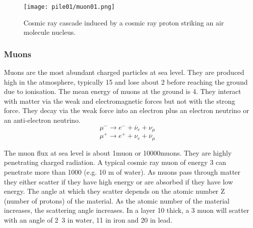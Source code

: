 \documentclass[twoside,titlepage,11pt,twocolumn,a4paper]{article}
\begin{document}
\begin{figure}
  \texttt{[image: pile01/muon01.png]}
  \caption{Cosmic ray cascade induced by a cosmic ray proton striking
    an air molecule nucleus. \citep{muonManual2005}}
\end{figure}

\subsubsection{Muons}
Muons are the most abundant charged particles at sea level. They are
produced high in the atmosphere, typically \unit{15}{\kilo\metre} and
lose about \unit{2}{\giga\electronvolt} before reaching the ground due
to ionisation. The mean energy of muons at the ground is
\unit{4}{\giga\electronvolt}. \citep{PDG2011} They interact with
matter via the weak and electromagnetic forces but not with the strong
force. They decay via the weak force into an electron plus an electron
neutrino or an anti-electron neutrino.
\[ \mu^- \rightarrow e^- + \overline{\nu}_e + \nu_\mu \]
\[ \mu^+ \rightarrow e^+ + \nu_e + \overline{\nu}_\mu \]

The muon flux at sea level is about
\unit{1}{muon\usk\rpsquare{\centi\metre}\usk\reciprocal\minute}
\citep{statisticalRec2007} or
\unit{10000}{muons\usk\rpsquare\metre\usk\reciprocal\minute}. They are
highly penetrating charged radiation.  A typical cosmic ray muon of
energy \unit{3}{\giga\electronvolt} can penetrate more than
\unit{1000}{\gram\usk\rpsquare{\centi\metre}} (e.g. 10 m of water). As
muons pass through matter they either scatter if they have high energy
or are absorbed if they have low energy. The angle at which they
scatter depends on the atomic number Z (number of protons) of the
material. As the atomic number of the material increases, the
scattering angle increases. In a layer \unit{10}{\centi\metre} thick,
a \unit{3}{\giga\electronvolt} muon will scatter with an angle of
\unit{2.3}{\milli\radian} in water, \unit{11}{\milli\radian} in iron
and \unit{20}{\milli\radian} in lead. \citep{Borozdin2003}
\end{document}

